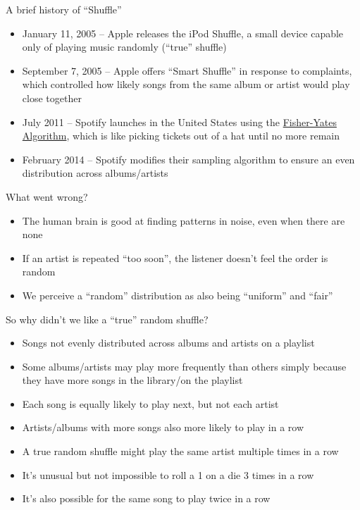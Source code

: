 \documentclass[
  ignorenonframetext,
]{beamer}
\begin{document}
\begin{frame}{A brief history of ``Shuffle''}
\label{a-brief-history-of-shuffle}
\begin{itemize}
\item
  January 11, 2005 -- Apple releases the iPod Shuffle, a small device
  capable only of playing music randomly (``true'' shuffle)
\item
  September 7, 2005 -- Apple offers ``Smart Shuffle'' in response to
  complaints, which controlled how likely songs from the same album or
  artist would play close together
\item
  July 2011 -- Spotify launches in the United States using the
  \href{https://engineering.atspotify.com/2014/02/28/how-to-shuffle-songs/}{Fisher-Yates
  Algorithm}, which is like picking tickets out of a hat until no more
  remain
\item
  February 2014 -- Spotify modifies their sampling algorithm to ensure
  an even distribution across albums/artists
\end{itemize}
\end{frame}

\begin{frame}{What went wrong?}
\label{what-went-wrong}
\begin{itemize}
\item
  The human brain is good at finding patterns in noise, even when there
  are none
\item
  If an artist is repeated ``too soon'', the listener doesn't feel the
  order is random
\item
  We perceive a ``random'' distribution as also being ``uniform'' and
  ``fair''
\end{itemize}
\end{frame}

\begin{frame}{So why didn't we like a ``true'' random shuffle?}
\label{so-why-didnt-we-like-a-true-random-shuffle}
\begin{itemize}
\item
  Songs not evenly distributed across albums and artists on a playlist
\item
  Some albums/artists may play more frequently than others simply
  because they have more songs in the library/on the playlist
\item
  Each song is equally likely to play next, but not each artist
\item
  Artists/albums with more songs also more likely to play in a row
\item
  A true random shuffle might play the same artist multiple times in a
  row
\item
  It's unusual but not impossible to roll a 1 on a die 3 times in a row
\item
  It's also possible for the same song to play twice in a row
\end{itemize}
\end{frame}
\end{document}
